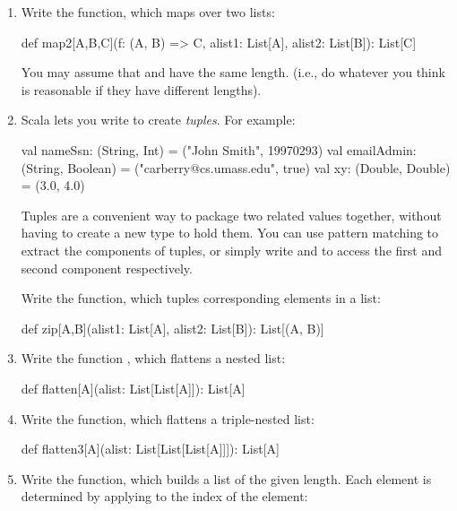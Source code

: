 \documentclass[9pt]{extbook}
\begin{document}
\begin{enumerate}

\item
Write the  function, which maps over two lists:

\begin{scalacode}
def map2[A,B,C](f: (A, B) => C, alist1: List[A], alist2: List[B]): List[C]
\end{scalacode}

You may assume that  and  have the same
length. (i.e., do whatever you think is reasonable if they have different
lengths).

\item
Scala lets you write  to create \emph{tuples}. For example:

\begin{scalacode}
val nameSsn: (String, Int) = ("John Smith", 19970293)
val emailAdmin: (String, Boolean) = ("carberry@cs.umass.edu", true)
val xy: (Double, Double) = (3.0, 4.0)
\end{scalacode}

Tuples are a convenient way to package two related values together, without
having to create a new type to hold them. You can use pattern matching to
extract the components of tuples, or simply write 
and  to access the first and second component respectively.

Write the  function, which tuples corresponding elements in a list:

\begin{scalacode}
def zip[A,B](alist1: List[A], alist2: List[B]): List[(A, B)]
\end{scalacode}

\item
Write the function , which flattens a nested list:

\begin{scalacode}
def flatten[A](alist: List[List[A]]): List[A]
\end{scalacode}

\item
Write the  function, which flattens a triple-nested list:

\begin{scalacode}
def flatten3[A](alist: List[List[List[A]]]): List[A]
\end{scalacode}

\item
Write the  function, which builds a list of the given length. Each
element is determined by applying  to the index of the element:


\end{enumerate}
\end{document}
